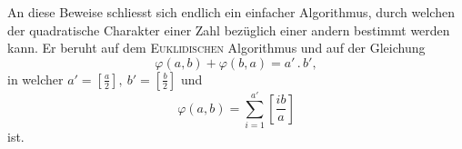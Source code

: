 An diese Beweise schliesst sich endlich ein einfacher Algorithmus, durch welchen der quadratische Charakter einer Zahl bezüglich einer andern bestimmt werden kann. Er beruht auf dem \textsc{Euklidischen} Algorithmus und auf der Gleichung
\[
\varphi(a,b)+\varphi(b,a)=a'\mathbin{.}b',
\]
in welcher \(a'=\left[\frac{a}{2}\right],\ b'=\left[\frac{b}{2}\right]\) und
\[
\varphi(a,b)=\sum_{i=1}^{a'}\left[\frac{ib}{a}\right]
\]
ist.
